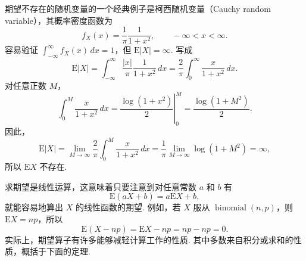 \begin{example}[柯西分布的均值]\label{ex:2.2.4}
期望不存在的随机变量的一个经典例子是柯西随机变量（Cauchy random variable），其概率密度函数为
$$f_X(x)=\frac1\pi\frac1{1+x^2},\qquad-\infty<x<\infty.$$
容易验证 $\int_{-\infty}^\infty f_X(x)\,dx=1$，但 $\mathrm E|X|=\infty$. 写成
$$\mathrm E|X|=\int_{-\infty}^\infty\frac{|x|}\pi\frac1{1+x^2}\,dx
=\frac2\pi\int_0^\infty\frac{x}{1+x^2}\,dx.$$
对任意正数 $M$，
$$\int_0^M\frac{x}{1+x^2}\,dx
=\left.\frac{\log(1+x^2)}2\right|_0^M=\frac{\log(1+M^2)}2.$$
因此，
$$\mathrm E|X|=\lim_{M\to\infty}\frac2\pi\int_0^M\frac{x}{1+x^2}\,dx
=\frac1\pi\lim_{M\to\infty}\log(1+M^2)=\infty,$$
所以 $\mathrm EX$ 不存在.
\end{example}

求期望是线性运算，这意味着只要注意到对任意常数 $a$ 和 $b$ 有
\begin{equation}\label{eq:2.2.1}
\mathrm E(aX+b)=a\mathrm EX+b,
\end{equation}
就能容易地算出 $X$ 的线性函数的期望. 例如，若 $X$ 服从 $\operatorname{binomial}(n,p)$，则 $\mathrm EX=np$，所以
$$\mathrm E(X-np)=\mathrm EX-np=np-np=0.$$
实际上，期望算子有许多能够减轻计算工作的性质. 其中多数来自积分或求和的性质，概括于下面的定理.

